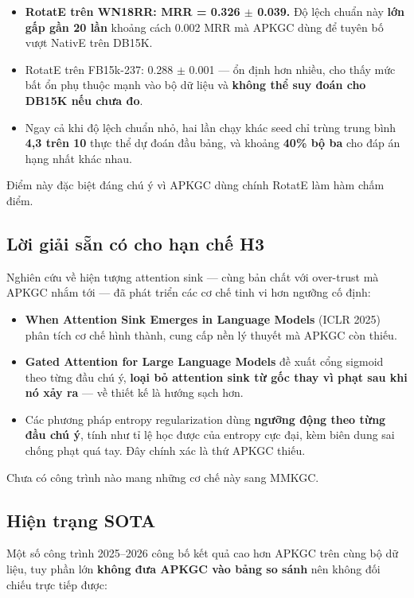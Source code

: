 \documentclass[11pt,a4paper]{article}
\begin{document}
\begin{itemize}\itemsep2pt
\item \textbf{RotatE trên WN18RR: MRR = 0.326 $\pm$ 0.039.} Độ lệch chuẩn này \textbf{lớn gấp gần 20 lần} khoảng cách 0.002 MRR mà APKGC dùng để tuyên bố vượt NativE trên DB15K.
\item RotatE trên FB15k-237: 0.288 $\pm$ 0.001 --- ổn định hơn nhiều, cho thấy mức bất ổn phụ thuộc mạnh vào bộ dữ liệu và \textbf{không thể suy đoán cho DB15K nếu chưa đo}.
\item Ngay cả khi độ lệch chuẩn nhỏ, hai lần chạy khác seed chỉ trùng trung bình \textbf{4,3 trên 10} thực thể dự đoán đầu bảng, và khoảng \textbf{40\% bộ ba} cho đáp án hạng nhất khác nhau.
\end{itemize}
Điểm này đặc biệt đáng chú ý vì APKGC dùng chính RotatE làm hàm chấm điểm.

\subsection{Lời giải sẵn có cho hạn chế H3}
Nghiên cứu về hiện tượng attention sink --- cùng bản chất với over-trust mà APKGC nhắm tới --- đã phát triển các cơ chế tinh vi hơn ngưỡng cố định:

\begin{itemize}\itemsep2pt
\item \textbf{When Attention Sink Emerges in Language Models} (ICLR 2025) phân tích cơ chế hình thành, cung cấp nền lý thuyết mà APKGC còn thiếu.
\item \textbf{Gated Attention for Large Language Models} đề xuất cổng sigmoid theo từng đầu chú ý, \textbf{loại bỏ attention sink từ gốc thay vì phạt sau khi nó xảy ra} --- về thiết kế là hướng sạch hơn.
\item Các phương pháp entropy regularization dùng \textbf{ngưỡng động theo từng đầu chú ý}, tính như tỉ lệ học được của entropy cực đại, kèm biên dung sai chống phạt quá tay. Đây chính xác là thứ APKGC thiếu.
\end{itemize}
Chưa có công trình nào mang những cơ chế này sang MMKGC.

\subsection{Hiện trạng SOTA}
Một số công trình 2025--2026 công bố kết quả cao hơn APKGC trên cùng bộ dữ liệu, tuy phần lớn \textbf{không đưa APKGC vào bảng so sánh} nên không đối chiếu trực tiếp được:
\end{document}
